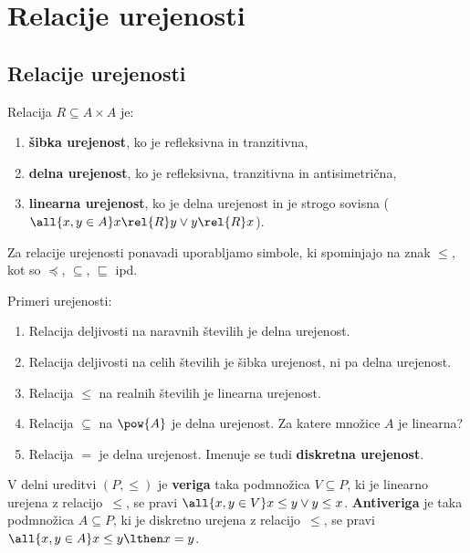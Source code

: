 \chapter{Relacije urejenosti}

\section{Relacije urejenosti}
\begin{definicija}
  Relacija $R \subseteq A \times A$ je:
  \begin{enumerate}
  \item \textbf{šibka urejenost}, ko je refleksivna in tranzitivna,
  \item \textbf{delna urejenost}, ko je refleksivna, tranzitivna in antisimetrična,
  \item \textbf{linearna urejenost}, ko je delna urejenost in je strogo sovisna ($\all{x, y \in A} x \rel{R} y \lor y \rel{R} x$).
  \end{enumerate}
\end{definicija}

Za relacije urejenosti ponavadi uporabljamo simbole, ki spominjajo na znak $\leq$, kot so $\preceq$, $\subseteq$, $\sqsubseteq$ ipd.

\begin{zgled}
  Primeri urejenosti:
  \begin{enumerate}
    \item Relacija deljivosti na naravnih številih je delna urejenost.
    \item Relacija deljivosti na celih številih je šibka urejenost, ni pa delna urejenost.
    \item Relacija $\leq$ na realnih številih je linearna urejenost.
    \item Relacija $\subseteq$ na $\pow{A}$ je delna urejenost. Za katere množice $A$ je linearna?
    \item Relacija $=$ je delna urejenost. Imenuje se tudi \textbf{diskretna urejenost}.
  \end{enumerate}
\end{zgled}


\begin{definicija}
  V delni ureditvi $(P, {\leq})$ je \textbf{veriga} taka podmnožica $V \subseteq P$, ki je linearno urejena z relacijo~$\leq$, se pravi $\all{x, y \in V} x \leq y \lor y \leq x$. \textbf{Antiveriga} je taka podmnožica $A \subseteq P$, ki je diskretno urejena z relacijo~$\leq$, se pravi $\all{x, y \in A} x \leq y \lthen x = y$.
\end{definicija}

